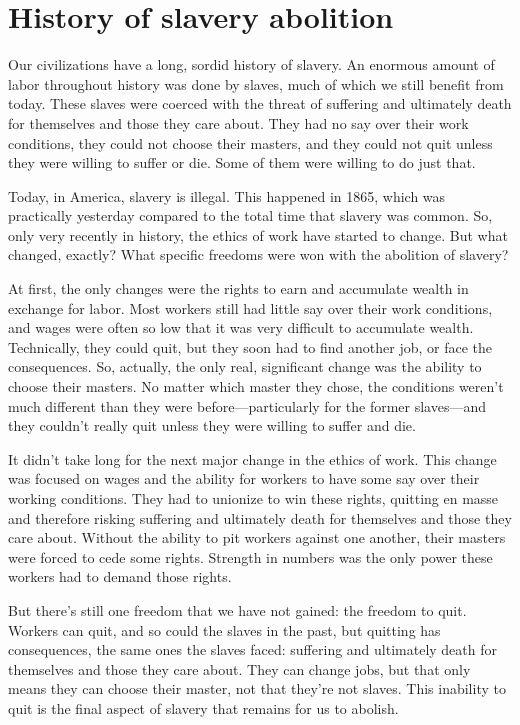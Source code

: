 \section{History of slavery abolition}
Our civilizations have a long, sordid history of slavery. An enormous amount of labor throughout history was done by slaves, much of which we still benefit from today. These slaves were coerced with the threat of suffering and ultimately death for themselves and those they care about. They had no say over their work conditions, they could not choose their masters, and they could not quit unless they were willing to suffer or die. Some of them were willing to do just that.

Today, in America, slavery is illegal. This happened in 1865, which was practically yesterday compared to the total time that slavery was common. So, only very recently in history, the ethics of work have started to change. But what changed, exactly? What specific freedoms were won with the abolition of slavery?

At first, the only changes were the rights to earn and accumulate wealth in exchange for labor. Most workers still had little say over their work conditions, and wages were often so low that it was very difficult to accumulate wealth. Technically, they could quit, but they soon had to find another job, or face the consequences. So, actually, the only real, significant change was the ability to choose their masters. No matter which master they chose, the conditions weren't much different than they were before---particularly for the former slaves---and they couldn't really quit unless they were willing to suffer and die.

It didn't take long for the next major change in the ethics of work. This change was focused on wages and the ability for workers to have some say over their working conditions. They had to unionize to win these rights, quitting en masse and therefore risking suffering and ultimately death for themselves and those they care about. Without the ability to pit workers against one another, their masters were forced to cede some rights. Strength in numbers was the only power these workers had to demand those rights.

But there's still one freedom that we have not gained: the freedom to quit. Workers can quit, and so could the slaves in the past, but quitting has consequences, the same ones the slaves faced: suffering and ultimately death for themselves and those they care about. They can change jobs, but that only means they can choose their master, not that they're not slaves. This inability to quit is the final aspect of slavery that remains for us to abolish.

